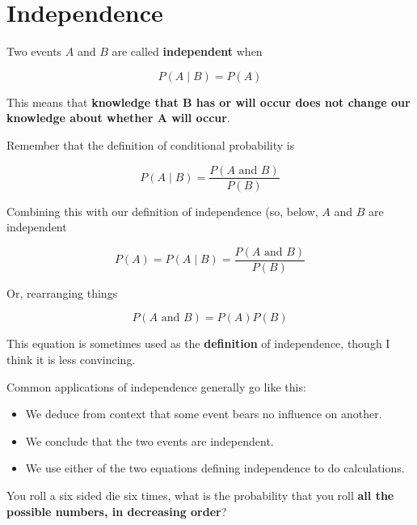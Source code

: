 \section{Independence}

\begin{frame}

Two events $A$ and $B$ are called \textbf{independent} when

$$ P(A \mid B) = P(A) $$

This means that \textbf{knowledge that B has or will occur does not change our
knowledge about whether A will occur}.

\end{frame}
%

%
\begin{frame}

Remember that the definition of conditional probability is

$$ P(A \mid B) = \frac{P(A \text{ and } B)}{P(B)} $$

Combining this with our definition of independence (so, below, $A$ and $B$ are
independent

$$ P(A) = P(A \mid B) = \frac{P(A \text{ and } B)}{P(B)} $$

Or, rearranging things

$$ P(A \text{ and } B) = P(A) P(B) $$

This equation is sometimes used as the \textbf{definition} of independence,
though I think it is less convincing.

\end{frame}
%

%
\begin{frame}

Common applications of independence generally go like this:

\begin{itemize}
\item We deduce from context that some event bears no influence on another.
\item We conclude that the two events are independent.
\item We use either of the two equations defining independence to do
calculations.
\end{itemize}

\end{frame}
%

%
\begin{frame}

You roll a six sided die six times, what is the probability that you roll
\textbf{all
the possible numbers, in decreasing order}?

\end{frame}
%

